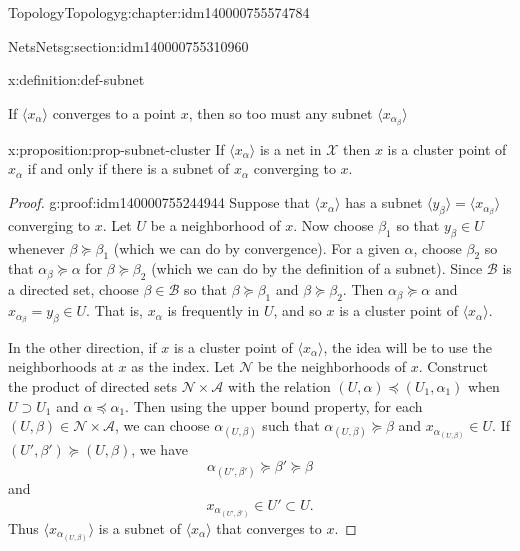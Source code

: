 \documentclass[oneside,10pt,]{book}
\numberwithin{equation}{section}
\newcommand\net[1]{\langle #1 \rangle}
\numberwithin{equation}{section}
\begin{document}
\begin{chapterptx}{Topology}{}{Topology}{}{}{g:chapter:idm140000755574784}
\begin{sectionptx}{Nets}{}{Nets}{}{}{g:section:idm140000755310960}
\begin{definition}{}{x:definition:def-subnet}
\begin{itemize}[label=\textbullet]
\end{itemize}
%
\end{definition}
If \(\net{x_\alpha}\) converges to a point \(x\), then so too must any subnet \(\net{x_{\alpha_\beta}}\)%
\begin{proposition}{}{}{x:proposition:prop-subnet-cluster}%
If \(\net{x_\alpha}\) is a net in \(\mathcal X\) then \(x\) is a cluster point of \(x_\alpha\) if and only if there is a subnet of \(x_\alpha\) converging to \(x\).%
\end{proposition}
\begin{proof}{}{g:proof:idm140000755244944}
Suppose that \(\net{x_\alpha}\) has a subnet \(\net{y_\beta} = \net{x_{\alpha_\beta}}\) converging to \(x\). Let \(U\) be a neighborhood of \(x\). Now choose \(\beta_1\) so that \(y_{\beta} \in U\) whenever \({\beta} \succeq \beta_1\) (which we can do by convergence). For a given \(\alpha\), choose \(\beta_2\) so that \(\alpha_{\beta} \succeq \alpha\) for \(\beta \succeq \beta_2\) (which we can do by the definition of a subnet). Since \(\mathcal B\) is a directed set, choose \(\beta \in \mathcal B\) so that \(\beta \succeq \beta_1\) and \(\beta \succeq \beta_2\). Then \(\alpha_\beta \succeq \alpha\) and \(x_{\alpha_\beta} = y_\beta \in U\). That is, \(x_{\alpha}\) is frequently in \(U\), and so \(x\) is a cluster point of \(\net{x_\alpha}\).%
\par
In the other direction, if \(x\) is a cluster point of \(\net{x_\alpha}\), the idea will be to use the neighborhoods at \(x\) as the index. Let \(\mathcal N\) be the neighborhoods of \(x\). Construct the product of directed sets \(\mathcal N \times \mathcal A\) with the relation \((U, \alpha) \preceq (U_1, \alpha_1)\) when \(U \supset U_1\) and \(\alpha \preceq \alpha_1\). Then using the upper bound property, for each \((U, \beta) \in \mathcal N \times \mathcal A\), we can choose \(\alpha_{(U, \beta)}\) such that \(\alpha_{(U, \beta)} \succeq \beta\) and \(x_{\alpha_{(U, \beta)}} \in U\). If \({(U', \beta')} \succeq (U, \beta)\), we have%
\begin{equation*}
\alpha_{{(U', \beta')}} \succeq {\beta'} \succeq \beta
\end{equation*}
and%
\begin{equation*}
x_{\alpha_{{(U', \beta')}}} \in {U'} \subset U\text{.}
\end{equation*}
Thus \(\net{x_{\alpha_{{(U, \beta)}}}}\) is a subnet of \(\net{x_\alpha}\) that converges to \(x\).%
\end{proof}
\end{sectionptx}

\end{chapterptx}
\end{document}
